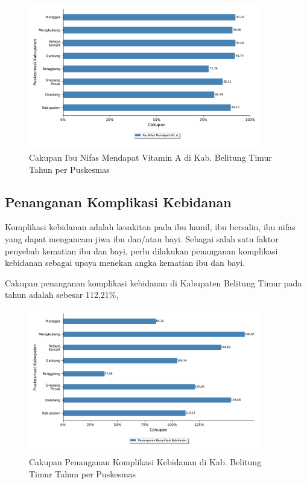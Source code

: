 \begin{figure}[H]
    \centering{}
    \includegraphics[width=0.9\textwidth]{bab_05/bab_05_05d_nifasVitA}
    \caption{Cakupan Ibu Nifas Mendapat Vitamin A di Kab. Belitung Timur Tahun \tP per Puskesmas}
    \label{fig:Cakupan-Nifas-VitA}
\end{figure}

\subsection{Penanganan Komplikasi Kebidanan}
Komplikasi kebidanan adalah kesakitan pada ibu hamil, ibu bersalin, ibu nifas yang dapat mengancam jiwa ibu dan/atau bayi. Sebagai salah satu faktor penyebab kematian ibu dan bayi, perlu dilakukan penanganan komplikasi kebidanan sebagai upaya menekan angka kematian ibu dan bayi.

Cakupan penanganan komplikasi kebidanan di Kabupaten Belitung Timur pada tahun \tP adalah sebesar 112,21\%,

\begin{figure}[H]
    \centering
    \includegraphics[width=0.9\textwidth]{bab_05/bab_05_05e_komplikasiKebidanan}
    \caption{Cakupan Penanganan Komplikasi Kebidanan di Kab. Belitung Timur Tahun \tP per Puskesmas}
    \label{fig:Cakupan-Komplikasi-Kebidanan}
\end{figure}


